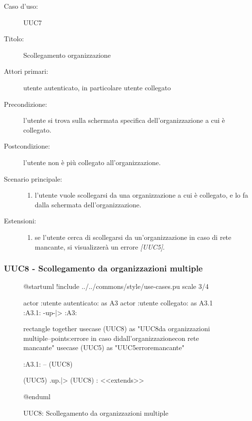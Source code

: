 \documentclass[../analisi-dei-requisiti.tex]{subfiles}
\begin{document}
\begin{description}
  \item[Caso d’uso:] UUC7
  \item[Titolo:] Scollegamento organizzazione
  \item[Attori primari:] utente autenticato, in particolare utente collegato
  \item[Precondizione:] l'utente si trova sulla schermata specifica dell'organizzazione a cui è collegato.
  \item[Postcondizione:] l'utente non è più collegato all'organizzazione.
  \item[Scenario principale:]
        \begin{enumerate}
          \item l'utente vuole scollegarsi da una organizzazione a cui è collegato, e lo fa dalla schermata dell'organizzazione.
        \end{enumerate}
  \item[Estensioni:]
        \begin{enumerate}
          \item se l'utente cerca di scollegarsi da un'organizzazione in caso di rete mancante, si visualizzerà un errore \emph{[UUC5]}.
        \end{enumerate}
\end{description}

\subsubsection{UUC8 - Scollegamento da organizzazioni multiple}%
\label{subsub:UUC8utente}

\begin{figure}[h!]
  \centering
  \begin{plantuml}
  @startuml
  !include ../../commons/style/use-cases.pu
  scale 3/4

  actor :utente autenticato: as A3
  actor :utente collegato: as A3.1
  :A3.1: -up-|> :A3:

  rectangle {
    together {
      usecase (UUC8) as "UUC8\nScollegamento da organizzazioni multiple\n--\nExtension points:\nVisualizzazione errore in caso di\nscollegamento dall'organizzazione\n con rete mancante"
      usecase (UUC5) as "UUC5\nVisualizzazione errore\nrete mancante"
    }
  }

  :A3.1: -- (UUC8)

  (UUC5) .up.|> (UUC8) : <<extends>>

  @enduml
  \end{plantuml}
  \caption{UUC8: Scollegamento da organizzazioni multiple}
  \label{fig:uuc8}
\end{figure}
\end{document}
